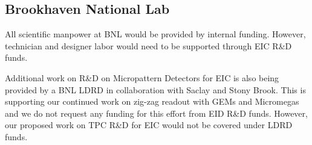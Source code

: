 \subsection{Brookhaven National Lab} 
All scientific manpower at BNL would be provided by internal funding. However, technician and designer labor would need to be supported through EIC R\&D funds.   

Additional work on R\&D on Micropattern Detectors for EIC is also being provided by a BNL LDRD in collaboration with Saclay and Stony Brook. This is supporting our continued work on zig-zag readout with GEMs and Micromegas and we do not request any funding for this effort from EID R\&D funds. However, our proposed work on TPC R\&D for EIC would not be covered under LDRD funds.
